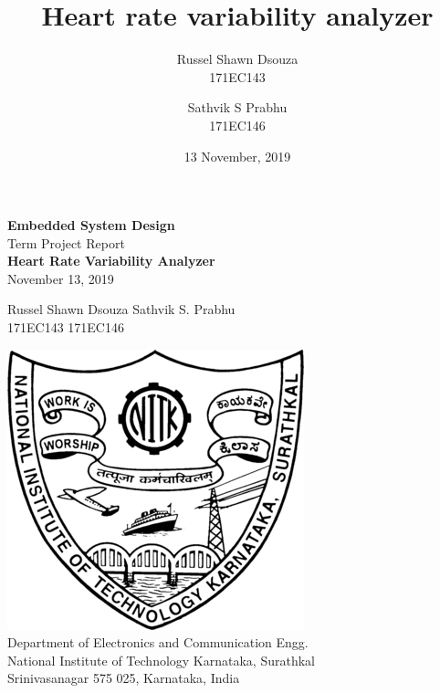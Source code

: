 \documentclass[11pt]{article}
\title{\textbf{Heart rate variability analyzer}}
\author{
  Russel Shawn Dsouza\\
  171EC143
  \and
  Sathvik S Prabhu\\
  171EC146
}
\date{13 November, 2019}
\theoremstyle{definition}
\begin{document}
  \begin{titlepage}
    \begin{center}
      \LARGE{\textbf{Embedded System Design}}\\
      \vspace*{2em}
      \LARGE{Term Project Report}\\
      \huge{\textbf{Heart Rate Variability Analyzer}}\\
      \vspace*{1em}
      \LARGE{November 13, 2019}
    \end{center}

    \vspace*{2em}
    \hspace*{5em} \Large{Russel Shawn Dsouza} \hspace*{5em} \Large{Sathvik S. Prabhu}\\
    \hspace*{6em} \Large{171EC143} \hspace*{10em} \Large{171EC146}\\
    \vspace*{2em}
    \begin{center}
    \includegraphics[scale=0.5]{nitk_logo}\\
    \vspace*{3em}
    Department of Electronics and Communication Engg.\\
    National Institute of Technology Karnataka, Surathkal\\
    Srinivasanagar 575 025, Karnataka, India
    \end{center}
  \end{titlepage}
  \thispagestyle{empty}


  \newpage
  \tableofcontents
  \thispagestyle{empty}
\end{document}
